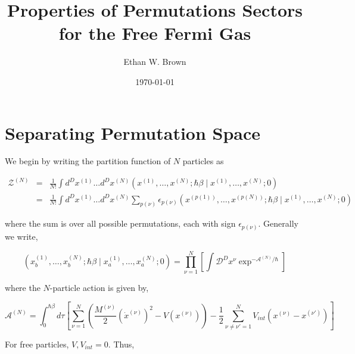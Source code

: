 \documentclass[aps,preprint,showpacs,superscriptaddress,groupedaddress]{revtex4}  %
\begin{document}
\title{Properties of Permutations Sectors for the Free Fermi Gas}

\author{Ethan W. Brown}
\date{\today}

\begin{abstract}
\end{abstract}

\pacs{}
\maketitle

\section{Separating Permutation Space}

We begin by writing the partition function of $N$ particles as

\begin{eqnarray}
  \mathcal{Z}^{(N)} &=& \frac{1}{N!} \int d^{D}x^{(1)} \dots d^{D}x^{(N)} (x^{(1)},\dots,x^{(N)};\hbar \beta \mid x^{(1)},\dots,x^{(N)};0) \\
                    &=& \frac{1}{N!} \int d^{D}x^{(1)} \dots d^{D}x^{(N)} \sum_{p(\nu)} \epsilon_{p(\nu)} (x^{(p(1))},\dots,x^{(p(N))};\hbar \beta \mid x^{(1)},\dots,x^{(N)};0)
\end{eqnarray}

where the sum is over all possible permutations, each with sign $\epsilon_{p(\nu)}$. Generally we write,

\begin{equation}
  (x_{b}^{(1)},\dots,x_{b}^{(N)};\hbar \beta \mid x_{a}^{(1)},\dots,x_{a}^{(N)};0) = \prod_{\nu=1}^{N} [\int \mathcal{D}^{D}x^{\nu}\exp^{-\mathcal{A}^{(N)}/\hbar}]
\end{equation}

where the $N$-particle action is given by,

\begin{equation}
  \mathcal{A}^{(N)} = \int_{0}^{\hbar \beta} d\tau [\sum_{\nu=1}^{N}(\frac{M^{(\nu)}}{2}(\dot{x}^{(\nu)})^{2} - V(x^{(\nu)})) - \frac{1}{2}\sum_{\nu\neq\nu'=1}^{N}V_{int}(x^{(\nu)}-x^{(\nu')})]
\end{equation}

For free particles, $V, V_{int} = 0$. Thus,
\end{document}
